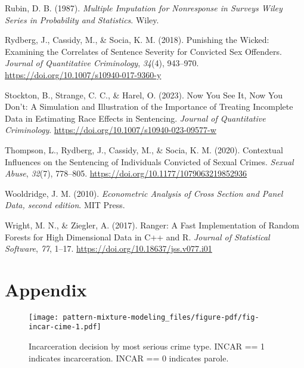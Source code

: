 \documentclass[
  letterpaper,
  DIV=11,
  numbers=noendperiod]{scrartcl}
\newlength{\cslhangindent}
\newlength{\cslentryspacingunit} %
\newenvironment{CSLReferences}[2] %
 {%
  \setlength{\parindent}{0pt}
  \ifodd #1
  \let\oldpar\par
  \def\par{\hangindent=\cslhangindent\oldpar}
  \fi
  \setlength{\parskip}{#2\cslentryspacingunit}
 }%
 {}
\begin{document}
\begin{CSLReferences}{1}{0}
\leavevmode{}%
Rubin, D. B. (1987). \emph{{Multiple Imputation for Nonresponse in
Surveys {\textbar} Wiley Series in Probability and Statistics}}.
{Wiley}.

\leavevmode{}%
Rydberg, J., Cassidy, M., \& Socia, K. M. (2018). Punishing the
{Wicked}: {Examining} the {Correlates} of {Sentence Severity} for
{Convicted Sex Offenders}. \emph{Journal of Quantitative Criminology},
\emph{34}(4), 943--970. \url{https://doi.org/10.1007/s10940-017-9360-y}

\leavevmode{}%
Stockton, B., Strange, C. C., \& Harel, O. (2023). Now You See It, Now
You Don{'}t: A Simulation and Illustration of the Importance of Treating
Incomplete Data in Estimating Race Effects in Sentencing. \emph{Journal
of Quantitative Criminology}.
\url{https://doi.org/10.1007/s10940-023-09577-w}

\leavevmode{}%
Thompson, L., Rydberg, J., Cassidy, M., \& Socia, K. M. (2020).
Contextual {Influences} on the {Sentencing} of {Individuals Convicted}
of {Sexual Crimes}. \emph{Sexual Abuse}, \emph{32}(7), 778--805.
\url{https://doi.org/10.1177/1079063219852936}

\leavevmode{}%
Wooldridge, J. M. (2010). \emph{Econometric {Analysis} of {Cross
Section} and {Panel Data}, second edition}. {MIT Press}.

\leavevmode{}%
Wright, M. N., \& Ziegler, A. (2017). Ranger: {A Fast Implementation} of
{Random Forests} for {High Dimensional Data} in {C}++ and {R}.
\emph{Journal of Statistical Software}, \emph{77}, 1--17.
\url{https://doi.org/10.18637/jss.v077.i01}

\end{CSLReferences}

\newpage

\hypertarget{appendix}{%
\section*{Appendix}\label{appendix}}

\begin{figure}

{\centering \texttt{[image: pattern-mixture-modeling\_files/figure-pdf/fig-incar-cime-1.pdf]}

}

\caption{\label{fig-incar-cime}Incarceration decision by most serious
crime type. INCAR == 1 indicates incarceration. INCAR == 0 indicates
parole.}

\end{figure}
\end{document}
